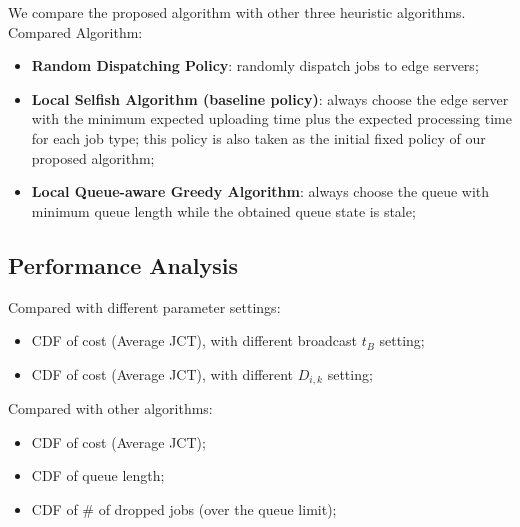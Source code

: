 We compare the proposed algorithm with other three heuristic algorithms.
Compared Algorithm:
\begin{itemize}
    \item \textbf{Random Dispatching Policy}:
            randomly dispatch jobs to edge servers;
    \item \textbf{Local Selfish Algorithm (baseline policy)}:
            always choose the edge server with the minimum expected uploading time plus the expected processing time for each job type; this policy is also taken as the initial fixed policy of our proposed algorithm;
    \item \textbf{Local Queue-aware Greedy Algorithm}:
            always choose the queue with minimum queue length while the obtained queue state is stale;
\end{itemize}


\subsection{Performance Analysis}
Compared with different parameter settings:
\begin{itemize}
    \item CDF of cost (Average JCT), with different broadcast $t_B$ setting;
    \item CDF of cost (Average JCT), with different \brlatency $D_{i,k}$ setting;
\end{itemize}

Compared with other algorithms:
\begin{itemize}
    \item CDF of cost (Average JCT);
    \item CDF of queue length;
    \item CDF of \# of dropped jobs (over the queue limit);
\end{itemize}